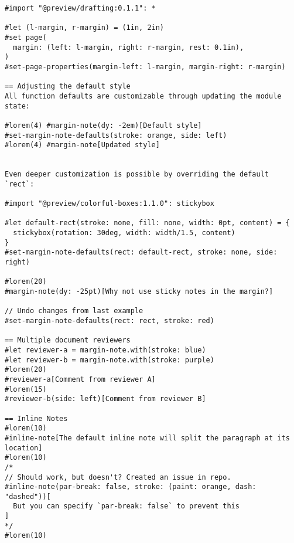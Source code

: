 \begin{verbatim}
#import "@preview/drafting:0.1.1": *

#let (l-margin, r-margin) = (1in, 2in)
#set page(
  margin: (left: l-margin, right: r-margin, rest: 0.1in),
)
#set-page-properties(margin-left: l-margin, margin-right: r-margin)

== Adjusting the default style
All function defaults are customizable through updating the module state:

#lorem(4) #margin-note(dy: -2em)[Default style]
#set-margin-note-defaults(stroke: orange, side: left)
#lorem(4) #margin-note[Updated style]


Even deeper customization is possible by overriding the default `rect`:

#import "@preview/colorful-boxes:1.1.0": stickybox

#let default-rect(stroke: none, fill: none, width: 0pt, content) = {
  stickybox(rotation: 30deg, width: width/1.5, content)
}
#set-margin-note-defaults(rect: default-rect, stroke: none, side: right)

#lorem(20)
#margin-note(dy: -25pt)[Why not use sticky notes in the margin?]

// Undo changes from last example
#set-margin-note-defaults(rect: rect, stroke: red)

== Multiple document reviewers
#let reviewer-a = margin-note.with(stroke: blue)
#let reviewer-b = margin-note.with(stroke: purple)
#lorem(20)
#reviewer-a[Comment from reviewer A]
#lorem(15)
#reviewer-b(side: left)[Comment from reviewer B]

== Inline Notes
#lorem(10)
#inline-note[The default inline note will split the paragraph at its location]
#lorem(10)
/*
// Should work, but doesn't? Created an issue in repo.
#inline-note(par-break: false, stroke: (paint: orange, dash: "dashed"))[
  But you can specify `par-break: false` to prevent this
]
*/
#lorem(10)
\end{verbatim}

\pandocbounded{}

